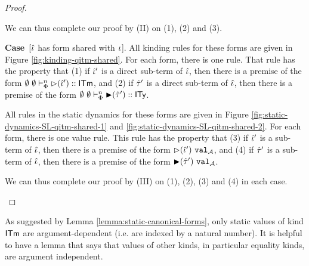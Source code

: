 \documentclass[12pt]{article}
\newcommand{\pfcase}[1]{\textbf{Case}~#1. }
\begin{document}
\begin{proof}
\begin{enumerate}
We can thus complete our proof by (II) on (1), (2) and (3).

\pfcase{[$\hat{\iota}$ has form shared with $\iota$]} All kinding rules for these forms are given in Figure \ref{fig:kinding-qitm-shared}. For each form, there is one rule. That rule has the property that (1) if $\hat{\iota}'$ is a direct sub-term of $\hat{\iota}$, then there is a premise of the form $\emptyset~\emptyset \vdash_{\Phi}^{n} {\rhd}(\hat{\iota}') :: {\sf ITm}$, and (2) if $\hat{\tau}'$ is a direct sub-term of $\hat{\iota}$, then there is a premise of the form $\emptyset~\emptyset \vdash_{\Phi}^{n} {\blacktriangleright}(\hat{\tau}') :: {\sf ITy}$.

All rules in the static dynamics for these forms are given in Figure \ref{fig:static-dynamics-SL-qitm-shared-1} and \ref{fig:static-dynamics-SL-qitm-shared-2}. For each form, there is one value rule. This rule has the property that (3) if $\hat{\iota}'$ is a sub-term of $\hat{\iota}$, then there is a premise of the form ${\rhd}(\hat{\iota}')~\mathtt{val}_{\mathcal{A}}$, and (4) if $\hat{\tau}'$ is a sub-term of $\hat{\iota}$, then there is a premise of the form ${\blacktriangleright}(\hat{\tau}')~\mathtt{val}_{\mathcal{A}}$.

We can thus complete our proof by (III) on (1), (2), (3) and (4) in each case.
\end{enumerate}
\end{proof}

As suggested by Lemma \ref{lemma:static-canonical-forms}, only static values of kind ${\sf ITm}$ are argument-dependent (i.e. are indexed by a natural number). It is helpful to have a lemma that says that values of other kinds, in particular equality kinds, are argument independent.
\end{document}
